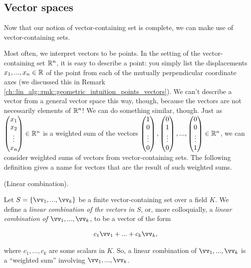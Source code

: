 \subsection*{Vector spaces}

Now that our notion of vector-containing set is complete, we can make use of vector-containing sets. 

Most often, we interpret vectors to be points. In the setting of the vector-containing set $\mathbb{R}^n$, it is easy to describe a point: you simply list the displacements $x_1, ..., x_n \in \mathbb{R}$ of the point from each of the mutually perpendicular coordinate axes (we discussed this in Remark \ref{ch::lin_alg::rmk::geometric_intuition_points_vectors}). We can't describe a vector from a general vector space this way, though, because the vectors are not necessarily elements of $\mathbb{R}^n$! We can do something similar, though. Just as $\begin{pmatrix} x_1 \\ x_2 \\ \vdots \\ x_n \end{pmatrix} \in \mathbb{R}^n$ is a weighted sum of the vectors $\begin{pmatrix} 1 \\ 0 \\ \vdots \\ 0 \end{pmatrix}, \begin{pmatrix} 0 \\ 1 \\ \vdots \\ 0 \end{pmatrix}, ..., \begin{pmatrix} 0 \\ 0 \\ \vdots \\ 1 \end{pmatrix} \in \mathbb{R}^n$, we can consider weighted sums of vectors from vector-containing sets. The following definition gives a name for vectors that are the result of such weighted sums.

\begin{defn}
    (Linear combination).
    
    Let $S = \{\vv_1, ..., \vv_k\}$ be a finite vector-containing set over a field $K$. We define a \textit{linear combination of the vectors in $S$}, or, more colloquially, a \textit{linear combination of $\vv_1, ..., \vv_k$}, to be a vector of the form
        
    \begin{align*}
        c_1 \vv_1 + ... + c_k \vv_k,
    \end{align*}
    
    where $c_1, ..., c_k$ are some scalars in $K$. So, a linear combination of $\vv_1, ..., \vv_k$ is a ``weighted sum'' involving $\vv_1, ..., \vv_k$.
\end{defn}

